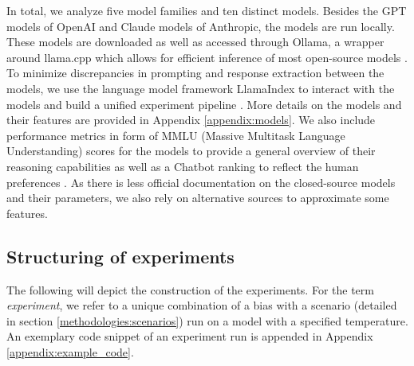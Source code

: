 \setlength{\parindent}{0pt}
\par In total, we analyze five model families and ten distinct models. Besides the GPT models of OpenAI and Claude models of Anthropic, the models are run locally. These models are downloaded as well as accessed through Ollama, a wrapper around llama.cpp which allows for efficient inference of most open-source models \parencite{gerganov2023llamacpp}. To minimize discrepancies in prompting and response extraction between the models, we use the language model framework LlamaIndex to interact with the models and build a unified experiment pipeline \parencite{liullamaindex2022}. More details on the models and their features are provided in Appendix \ref{appendix:models}. We also include performance metrics in form of MMLU (Massive Multitask Language Understanding) scores for the models to provide a general overview of their reasoning capabilities \parencite{hendrycks2020measuring} as well as a Chatbot ranking to reflect the human preferences \parencite{chiang2024chatbot}. As there is less official documentation on the closed-source models and their parameters, we also rely on alternative sources to approximate some features.


\subsection{Structuring of experiments}
\par The following will depict the construction of the experiments. For the term \textit{experiment}, we refer to a unique combination of a bias with a scenario (detailed in section \ref{methodologies:scenarios}) run on a model with a specified temperature. An exemplary code snippet of an experiment run is appended in Appendix \ref{appendix:example_code}.

